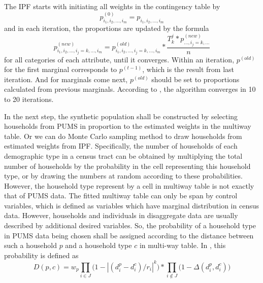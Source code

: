 \documentclass[11pt,twoside]{article}
\numberwithin{equation}{section}
\newcommand{\?}{\stackrel{?}{=}}
\begin{document}
The IPF starts with initiating all weights in the contingency table by  
\begin{equation}
	p_{i_1,i_2,...,i_m}^{(0)} = p_{i_1,i_2,...,i_m}
\end{equation}
and in each iteration, the proportions are updated by the formula
\begin{equation}
  p_{i_1,i_2,...,i_j=k,...,i_m}^{(new)} = p_{i_1,i_2,...,i_j=k,...,i_m}^{(old)} * \frac{T_k^j * p_{...,i_j=k,...}^{(new)}}{n} 
\end{equation} for all categories of each attribute, until it converges.
Within an iteration, $p^{(old)}$ for the first marginal corresponds to $p^{(t-1)}$, which is the result from last iteration.
And for marginals come next, $p^{(old)}$ should be set to proportions calculated from previous marginals.
According to \cite{beckman1996creating}, the algorithm converges in 10 to 20 iterations.

In the next step, the synthetic population shall be constructed by selecting households from PUMS in proportion to the estimated weights in the multiway table. Or we can do Monte Carlo sampling method to draw households from estimated weights from IPF.
Specifically, the number of households of each demographic type in a census tract can be obtained by multiplying the total number of households by the probability in the cell representing this household type, or by drawing the numbers at random according to these probabilities.
However, the household type represent by a cell in multiway table is not exactly that of PUMS data.
The fitted multiway table can only be span by control variables, which is defined as variables which have marginal distribution in census data.
However, households and individuals in disaggregate data are usually described by additional desired variables.
So, the probability of a household type in PUMS data being chosen shall be assigned according to the distance between such a household $p$ and a household type $c$ in multi-way table.
In \cite{beckman1996creating}, this probability is defined as 
\begin{equation}
  D(p,c) = w_p \prod_{i \in J}\Big(1-|(d_i^p-d_i^c)/r_i|^k\Big)*\prod_{i \notin J}\Big(1-\Delta(d_i^p, d_i^c)\Big)
\end{equation}
      
\end{document}
